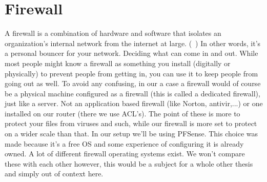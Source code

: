 \section{Firewall}
A firewall is a combination of hardware and software that isolates an organization's internal network from the internet at large. (~\textcite{NetworkingPearson}) In other words, it's a personal bouncer for your network. Deciding what can come in and out. While most people might know a firewall as something you install (digitally or physically) to prevent people from getting in, you can use it to keep people from going out as well. To avoid any confusing, in our a case a firewall would of course be a physical machine configured as a firewall (this is called a dedicated firewall), just like a server. Not an application based firewall (like Norton, antivir,...) or one installed on our router (there we use ACL's). The point of these is more to protect your files from viruses and such, while our firewall is more set to protect on a wider scale than that. In our setup we'll be using PFSense. This choice was made because it's a free OS and some experience of configuring it is already owned. A lot of different firewall operating systems exist. We won't compare these with each other however, this would be a subject for a whole other thesis and simply out of context here.
